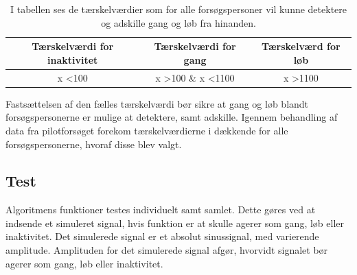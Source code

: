 \begin{table}[H]
	\centering
	\begin{tabular}{ccc}
		\hline
		\rowcolor[HTML]{C0C0C0} 
		Tærskelværdi for inaktivitet & Tærskelværdi for gang & Tærskelværd for løb \\ \hline
		x \textless 100 & x \textgreater 100 \& x \textless 1100 & x \textgreater 1100 \\ \hline
	\end{tabular}
	\caption{I tabellen ses de tærskelværdier som for alle forsøgspersoner vil kunne detektere og adskille gang og løb fra hinanden.}
	\label{tab:faelles_taerskel}
\end{table}\vspace{-0.5cm}
Fastsættelsen af den fælles tærskelværdi bør sikre at gang og løb blandt forsøgspersonerne er mulige at detektere, samt adskille. Igennem behandling af data fra pilotforsøget forekom tærskelværdierne i  dækkende for alle forsøgspersonerne, hvoraf disse blev valgt.


\subsection{Test}
Algoritmens funktioner testes individuelt samt samlet. Dette gøres ved at indsende et simuleret signal, hvis funktion er at skulle agerer som gang, løb eller inaktivitet. Det simulerede signal er et absolut sinussignal, med varierende amplitude. Amplituden for det simulerede signal afgør, hvorvidt signalet bør agerer som gang, løb eller inaktivitet.  

